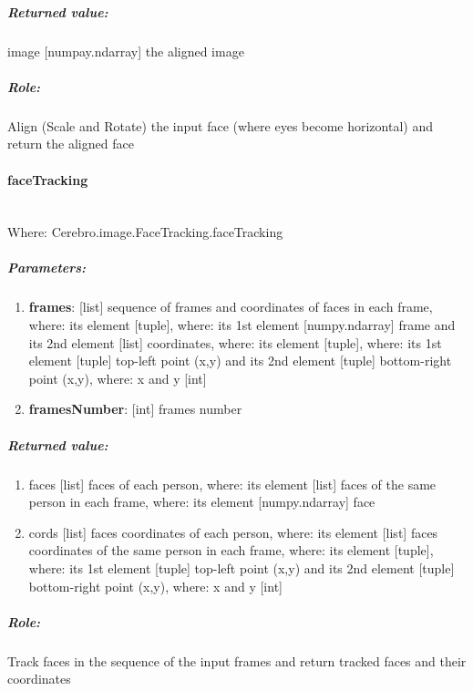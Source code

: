 \subparagraph{Returned value:}
\begin{changemargin}{1cm}{0cm}
	image [numpay.ndarray] the aligned image
\end{changemargin}

\subparagraph{Role:}
\begin{changemargin}{1cm}{0cm}
	Align (Scale and Rotate) the input face (where eyes become horizontal) and return the aligned face
\end{changemargin}


\paragraph{faceTracking} \mbox{} \\
Where: Cerebro.image.FaceTracking.faceTracking
\subparagraph{Parameters:}
\begin{changemargin}{0.5cm}{0cm}
	\begin{enumerate} 
		\item \textbf{frames}: [list] sequence of frames and coordinates of faces in each frame, where: its element [tuple], where: its 1st element [numpy.ndarray] frame and its 2nd element [list] coordinates, where: its element [tuple], where: its 1st element [tuple] top-left point (x,y) and its 2nd element [tuple] bottom-right point (x,y), where: x and y [int]
		\item \textbf{framesNumber}: [int] frames number
	\end{enumerate}
\end{changemargin}

\subparagraph{Returned value:}
\begin{changemargin}{1cm}{0cm}
	\begin{enumerate} 
		\item faces [list] faces of each person, where: its element [list] faces of the same person in each frame, where: its element [numpy.ndarray] face
		\item cords [list] faces coordinates of each person, where: its element [list] faces coordinates of the same person in each frame, where: its element [tuple], where: its 1st element [tuple] top-left point (x,y) and its 2nd element [tuple] bottom-right point (x,y), where: x and y [int]
	\end{enumerate}
\end{changemargin}

\subparagraph{Role:}
\begin{changemargin}{1cm}{0cm}
	Track faces in the sequence of the input frames and return tracked faces and their coordinates
\end{changemargin}